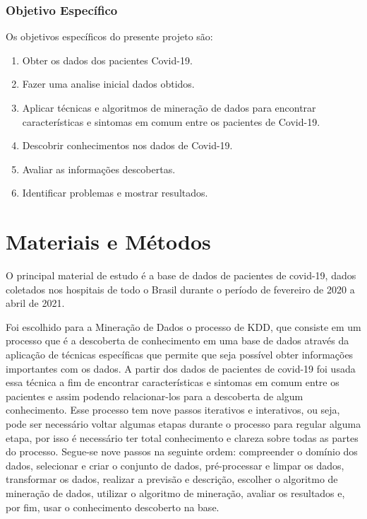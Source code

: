 \documentclass[tcc1]{uftex}
\begin{document}
\subsection*{Objetivo Específico}

Os objetivos específicos do presente projeto são: 
\begin{enumerate}
    \item Obter os dados dos pacientes Covid-19.
	\item Fazer uma analise inicial dados obtidos.
	\item Aplicar técnicas e algoritmos de mineração de dados para encontrar características e sintomas em comum entre os pacientes de Covid-19.
	\item Descobrir conhecimentos nos dados de Covid-19.
	\item Avaliar as informações descobertas.
	\item Identificar problemas e mostrar resultados.
\end{enumerate}


\chapter{Materiais e Métodos}

O principal material de estudo é a base de dados de pacientes de covid-19, dados coletados nos hospitais de todo o Brasil durante o período de fevereiro de 2020 a abril de 2021. 


	Foi escolhido para a Mineração de Dados o processo de KDD, que consiste em um processo que é a descoberta de conhecimento em uma base de dados através da aplicação de técnicas específicas que permite que seja possível obter informações importantes com os dados. A partir dos dados de pacientes de covid-19 foi usada essa técnica a fim de encontrar características e sintomas em comum entre os pacientes e assim podendo relacionar-los para a descoberta de algum conhecimento. Esse processo tem nove passos iterativos e interativos, ou seja, pode ser necessário voltar algumas etapas durante o processo para regular alguma etapa, por isso é necessário ter total conhecimento e clareza sobre todas as partes do processo. Segue-se nove passos na seguinte ordem: compreender o domínio dos dados, selecionar e criar o conjunto de dados, pré-processar e limpar os dados, transformar os dados, realizar a previsão e descrição, escolher o algoritmo de mineração de dados, utilizar o algoritmo de mineração, avaliar os resultados e, por fim, usar o conhecimento descoberto na base. \cite{maimon}
    
\end{document}
